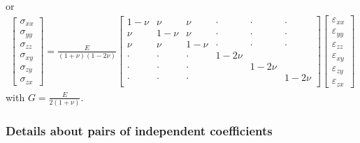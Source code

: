 \documentclass[letterpaper,10pt,english]{jupyterBook}
\begin{document}
\sphinxAtStartPar
or
\begin{equation*}
\begin{split}
\begin{bmatrix} \sigma_{xx} \\ \sigma_{yy} \\ \sigma_{zz} \\ \sigma_{xy} \\ \sigma_{zy} \\ \sigma_{zx} \end{bmatrix} =
  \frac{E}{(1+\nu)(1-2\nu)}
\begin{bmatrix}
  1-\nu &   \nu &   \nu & \cdot & \cdot & \cdot \\
    \nu & 1-\nu &   \nu & \cdot & \cdot & \cdot \\
    \nu &   \nu & 1-\nu & \cdot & \cdot & \cdot \\
 \cdot & \cdot & \cdot & 1-2\nu & & \\
 \cdot & \cdot & \cdot & & 1-2\nu & \\
 \cdot & \cdot & \cdot & & & 1-2\nu \\
\end{bmatrix}
\begin{bmatrix} \varepsilon_{xx} \\ \varepsilon_{yy} \\ \varepsilon_{zz} \\ \varepsilon_{xy} \\ \varepsilon_{zy} \\ \varepsilon_{zx}  \end{bmatrix}
\end{split}
\end{equation*}
\sphinxAtStartPar
with \(G = \frac{E}{2(1+\nu)}\).
\subsubsection*{Details about pairs of independent coefficients}
\end{document}
